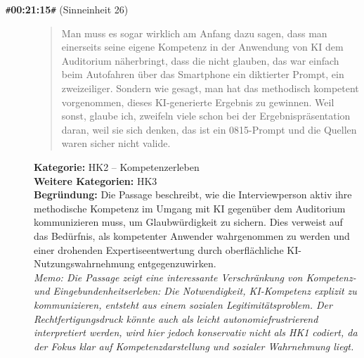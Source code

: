 \begin{description}
  \item[\texttt{\#}\textbf{00:21:15}\texttt{\#} (Sinneinheit 26)]
  \begin{quote}
  Man muss es sogar wirklich am Anfang dazu sagen, dass man einerseits seine eigene Kompetenz in der Anwendung von KI dem Auditorium näherbringt, dass die nicht glauben, das war einfach beim Autofahren über das Smartphone ein diktierter Prompt, ein zweizeiliger. Sondern wie gesagt, man hat das methodisch kompetent vorgenommen, dieses KI-generierte Ergebnis zu gewinnen. Weil sonst, glaube ich, zweifeln viele schon bei der Ergebnispräsentation daran, weil sie sich denken, das ist ein 0815-Prompt und die Quellen waren sicher nicht valide.
  \end{quote}
  \textbf{Kategorie:} HK2 -- Kompetenzerleben\\
  \textbf{Weitere Kategorien:} HK3\\
  \textbf{Begr\"undung:} Die Passage beschreibt, wie die Interviewperson aktiv ihre methodische Kompetenz im Umgang mit KI gegenüber dem Auditorium kommunizieren muss, um Glaubwürdigkeit zu sichern. Dies verweist auf das Bedürfnis, als kompetenter Anwender wahrgenommen zu werden und einer drohenden Expertiseentwertung durch oberflächliche KI-Nutzungswahrnehmung entgegenzuwirken.
  \\\textit{Memo: Die Passage zeigt eine interessante Verschränkung von Kompetenz- und Eingebundenheitserleben: Die Notwendigkeit, KI-Kompetenz explizit zu kommunizieren, entsteht aus einem sozialen Legitimitätsproblem. Der Rechtfertigungsdruck könnte auch als leicht autonomiefrustrierend interpretiert werden, wird hier jedoch konservativ nicht als HK1 codiert, da der Fokus klar auf Kompetenzdarstellung und sozialer Wahrnehmung liegt.}
\end{description}
\medskip

